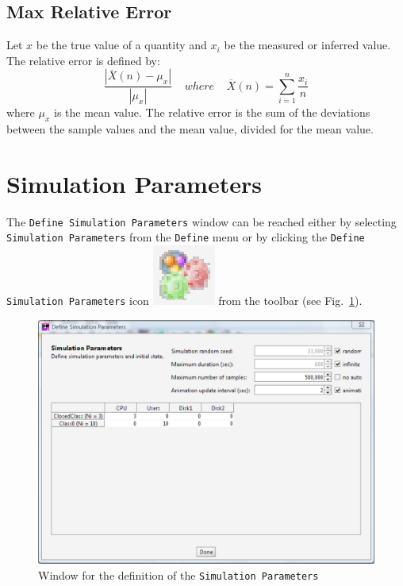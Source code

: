 \subsection{Max Relative Error}
\label{mrerr} Let $x$ be the true value of a quantity and $x_i$ be
the measured or inferred value. The relative error is defined by:
\[ \frac{|\overline{X}(n) - \mu_x|} {|\mu_x|} \;\;\;\; where
\;\;\;\;\overline{X}(n) = \sum_{i=1}^{n}  \frac{x_i}{n}\] where
$\mu_x$ is the mean value.  The relative error is the sum of the
deviations between the sample values and the mean value, divided
for the mean value.

\section{Simulation Parameters}
The \texttt{Define Simulation Parameters} window can be reached
either by selecting \texttt{Simulation Parameters} from the
\texttt{Define} menu or by clicking the \texttt{Define Simulation
Parameters} icon
\includegraphics[scale=.5]{img/jsimg/defineSimulationParameters.eps}
from the toolbar (see Fig.~\ref{fig:inistat}).

\begin{figure}[h]
    \begin{center}
        \includegraphics[scale=.5]{img/jsimg/6.2.eps}
    \end{center}
    \caption{Window for the definition of the \texttt{Simulation Parameters}}
    \label{fig:inistat}
\end{figure}

